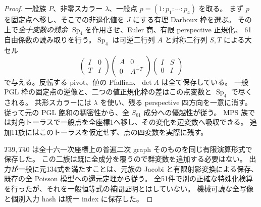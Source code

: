 \documentclass[11pt,a4paper]{ltjsarticle}
\DeclareMathOperator{\Sp}{Sp}
\theoremstyle{remark}
\begin{document}
\begin{proof}
一般族 $P$、非零スカラー $\lambda$、一般点 $p=(1:p_1:\cdots:p_4)$ を取る。
まず $p$ を固定点へ移し、そこでの非退化値を $J$ にする有理 Darboux 枠を選ぶ。
その上で\emph{全十変数の残余 $\Sp_4$}を作用させ、Euler 商、有限 perspective 正規化、
61自由係数の読み取りを行う。$\Sp_4$ は可逆二行列 $A$ と対称二行列 $S,T$ による大セル
\[
 \begin{pmatrix}I&0\\T&I\end{pmatrix}
 \begin{pmatrix}A&0\\0&A^{-T}\end{pmatrix}
 \begin{pmatrix}I&S\\0&I\end{pmatrix}
\]
で与える。反転する pivot、値の Pfaffian、$\det A$ は全て保存している。
一般 PGL 枠の固定点の逆像と、二つの値正規化枠の差はこの点変数と $\Sp_4$ で尽くされる。
共形スカラーには $\lambda$ を使い、残る perspective 四方向を一意に消す。
従って元の PGL 飽和の稠密性から、全 $S_{61}$ 成分への優越性が従う。
MPS 族では対角トーラスで一般点を全座標1へ移し、その変化を辺変数へ吸収できる。
追加11族にはこのトーラスを仮定せず、点の四変数を実際に残す。

$T39,T40$ は全十六一次座標上の普遍二次 graph そのものを同じ有限演算形式で保存した。
この二族は既に全成分を覆うので群変数を追加する必要はない。
出力が一般に元134式を満たすことは、元族の Jacobi と有限射影変換による保存、
既存の全 Poisson 模型への還元定理から従う。
全51件で別の正確な特殊化検算を行ったが、それを一般恒等式の補間証明とはしていない。
機械可読な全写像と個別入力 hash は統一 index に保存した\cite{known51-maps-v62}。
\end{proof}
\end{document}
